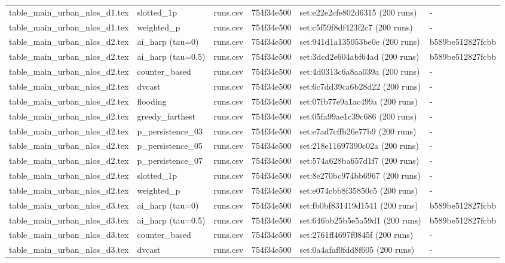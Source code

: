 \begin{tabular}{llllll}
table\_main\_urban\_nlos\_d1.tex & slotted\_1p & runs.csv & 754f34e500 & set:e22e2cfe802d6315 (200 runs) & - \\
table\_main\_urban\_nlos\_d1.tex & weighted\_p & runs.csv & 754f34e500 & set:c5f59f8df423f2c7 (200 runs) & - \\
table\_main\_urban\_nlos\_d2.tex & ai\_harp (tau=0) & runs.csv & 754f34e500 & set:941d1a135053be0e (200 runs) & b589be512827fcbb \\
table\_main\_urban\_nlos\_d2.tex & ai\_harp (tau=0.5) & runs.csv & 754f34e500 & set:3dcd2e604abf64ad (200 runs) & b589be512827fcbb \\
table\_main\_urban\_nlos\_d2.tex & counter\_based & runs.csv & 754f34e500 & set:4d0313c6a8aa039a (200 runs) & - \\
table\_main\_urban\_nlos\_d2.tex & dvcast & runs.csv & 754f34e500 & set:6c7dd39ca6b28d22 (200 runs) & - \\
table\_main\_urban\_nlos\_d2.tex & flooding & runs.csv & 754f34e500 & set:07fb77e9a1ac499a (200 runs) & - \\
table\_main\_urban\_nlos\_d2.tex & greedy\_farthest & runs.csv & 754f34e500 & set:05fa99ae1c39c686 (200 runs) & - \\
table\_main\_urban\_nlos\_d2.tex & p\_persistence\_03 & runs.csv & 754f34e500 & set:e7ad7cffb26e77b9 (200 runs) & - \\
table\_main\_urban\_nlos\_d2.tex & p\_persistence\_05 & runs.csv & 754f34e500 & set:218e11697390c02a (200 runs) & - \\
table\_main\_urban\_nlos\_d2.tex & p\_persistence\_07 & runs.csv & 754f34e500 & set:574a628ba657d1f7 (200 runs) & - \\
table\_main\_urban\_nlos\_d2.tex & slotted\_1p & runs.csv & 754f34e500 & set:8e270bc974bb6967 (200 runs) & - \\
table\_main\_urban\_nlos\_d2.tex & weighted\_p & runs.csv & 754f34e500 & set:e074cbb8f35850c5 (200 runs) & - \\
table\_main\_urban\_nlos\_d3.tex & ai\_harp (tau=0) & runs.csv & 754f34e500 & set:fb0bf831419d1541 (200 runs) & b589be512827fcbb \\
table\_main\_urban\_nlos\_d3.tex & ai\_harp (tau=0.5) & runs.csv & 754f34e500 & set:646bb25b5e5a59d1 (200 runs) & b589be512827fcbb \\
table\_main\_urban\_nlos\_d3.tex & counter\_based & runs.csv & 754f34e500 & set:2761ff4697f0845f (200 runs) & - \\
table\_main\_urban\_nlos\_d3.tex & dvcast & runs.csv & 754f34e500 & set:0a4afaf0fdd8f605 (200 runs) & - \\

\end{tabular}
